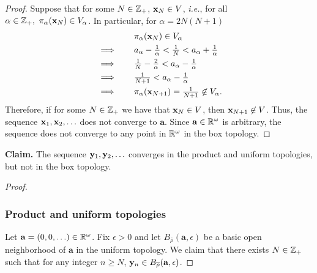 \begin{solution}
\begin{proof}
        Suppose that for some $N \in \mathbb{Z}_+$, $\mathbf{x}_N \in V$, \textit{i.e.}, for all $\alpha \in \mathbb{Z}_+,~ \pi_\alpha(\mathbf{x}_N) \in V_\alpha$.
        In particular, for $\alpha = 2 N (N + 1)$
        \begin{alignat*}{2}
            &           && \quad \pi_\alpha(\mathbf{x}_N) \in V_\alpha \\
            & \implies  && \quad a_\alpha - \tfrac{1}{\alpha} < \tfrac{1}{N} < a_\alpha + \tfrac{1}{\alpha} \\
            & \implies  && \quad \tfrac{1}{N} - \tfrac{2}{\alpha} < a_\alpha - \tfrac{1}{\alpha} \\
            & \implies  && \quad \tfrac{1}{N + 1} < a_\alpha - \tfrac{1}{\alpha} \\
            & \implies  && \quad \pi_\alpha(\mathbf{x}_{N+1}) = \tfrac{1}{N+1} \not\in V_\alpha.
        \end{alignat*}
        Therefore, if for some $N \in \mathbb{Z}_+$ we have that $\mathbf{x}_N \in V$, then $\mathbf{x}_{N+1} \not\in V$.
        Thus, the sequence $\mathbf{x}_1, \mathbf{x}_2, \ldots$ does not converge to $\mathbf{a}$.
        Since $\mathbf{a} \in \mathbb{R}^\omega$ is arbitrary, the sequence does not converge to any point in $\mathbb{R}^\omega$ in the box topology.
    \end{proof}
    \bigskip

    \noindent\textbf{Claim.} The sequence $\mathbf{y}_1, \mathbf{y}_2, \ldots$ converges in the product and uniform topologies, but not in the box topology.
    \begin{proof}~

        \subsubsection*{Product and uniform topologies}
        Let $\mathbf{a} = (0, 0, \ldots) \in \mathbb{R}^\omega$.
        Fix $\epsilon > 0$ and let $B_{\overline{\rho}}(\mathbf{a}, \epsilon)$ be a basic open neighborhood of $\mathbf{a}$ in the uniform topology.
        We claim that there exists $N \in \mathbb{Z}_+$ such that for any integer $n \geq N$, $\mathbf{y}_n \in B_{\overline{\rho}}(\mathbf{a}, \epsilon)$.


\end{proof}
\end{solution}
